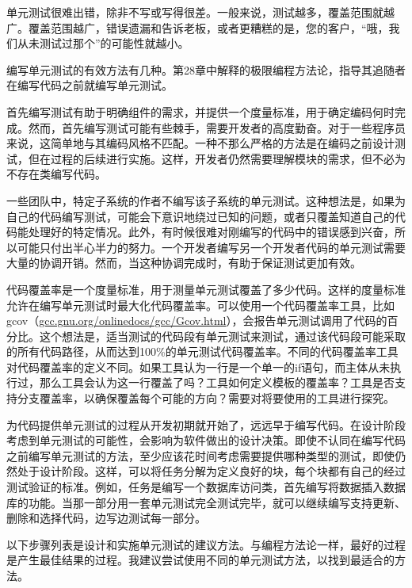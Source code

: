 
单元测试很难出错，除非不写或写得很差。一般来说，测试越多，覆盖范围就越广。覆盖范围越广，错误遗漏和告诉老板，或者更糟糕的是，您的客户，“哦，我们从未测试过那个”的可能性就越小。

编写单元测试的有效方法有几种。第28章中解释的极限编程方法论，指导其追随者在编写代码之前就编写单元测试。

首先编写测试有助于明确组件的需求，并提供一个度量标准，用于确定编码何时完成。然而，首先编写测试可能有些棘手，需要开发者的高度勤奋。对于一些程序员来说，这简单地与其编码风格不匹配。一种不那么严格的方法是在编码之前设计测试，但在过程的后续进行实施。这样，开发者仍然需要理解模块的需求，但不必为不存在类编写代码。

一些团队中，特定子系统的作者不编写该子系统的单元测试。这种想法是，如果为自己的代码编写测试，可能会下意识地绕过已知的问题，或者只覆盖知道自己的代码能处理好的特定情况。此外，有时候很难对刚编写的代码中的错误感到兴奋，所以可能只付出半心半力的努力。一个开发者编写另一个开发者代码的单元测试需要大量的协调开销。然而，当这种协调完成时，有助于保证测试更加有效。

代码覆盖率是一个度量标准，用于测量单元测试覆盖了多少代码。这样的度量标准允许在编写单元测试时最大化代码覆盖率。可以使用一个代码覆盖率工具，比如 gcov（\url{gcc.gnu.org/onlinedocs/gcc/Gcov.html}），会报告单元测试调用了代码的百分比。这个想法是，适当测试的代码段有单元测试来测试，通过该代码段可能采取的所有代码路径，从而达到100\%的单元测试代码覆盖率。不同的代码覆盖率工具对代码覆盖率的定义不同。如果工具认为一行是一个单一的if语句，而主体从未执行过，那么工具会认为这一行覆盖了吗？工具如何定义模板的覆盖率？工具是否支持分支覆盖率，以确保覆盖每个可能的方向？需要对将要使用的工具进行探究。


为代码提供单元测试的过程从开发初期就开始了，远远早于编写代码。在设计阶段考虑到单元测试的可能性，会影响为软件做出的设计决策。即使不认同在编写代码之前编写单元测试的方法，至少应该花时间考虑需要提供哪种类型的测试，即使仍然处于设计阶段。这样，可以将任务分解为定义良好的块，每个块都有自己的经过测试验证的标准。例如，任务是编写一个数据库访问类，首先编写将数据插入数据库的功能。当那一部分用一套单元测试完全测试完毕，就可以继续编写支持更新、删除和选择代码，边写边测试每一部分。

以下步骤列表是设计和实施单元测试的建议方法。与编程方法论一样，最好的过程是产生最佳结果的过程。我建议尝试使用不同的单元测试方法，以找到最适合的方法。



